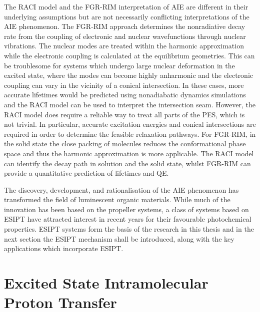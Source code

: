 The \ac{RACI} model and the \ac{FGR-RIM} interpretation of AIE are different in their underlying assumptions but are not necessarily conflicting interpretations of the AIE phenomenon. The \ac{FGR-RIM} approach determines the nonradiative decay rate from the coupling of electronic and nuclear wavefunctions through nuclear vibrations. The nuclear modes are treated within the harmonic approximation while the electronic coupling is calculated at the equilibrium geometries. This can be troublesome for systems which undergo large nuclear deformation in the excited state, where the modes can become highly anharmonic and the electronic coupling can vary in the vicinity of a conical intersection. In these cases, more accurate lifetimes would be predicted using nonadiabatic dynamics simulations and the \ac{RACI} model can be used to interpret the intersection seam. However, the \ac{RACI} model does require a reliable way to treat all parts of the \ac{PES}, which is not trivial. In particular, accurate excitation energies and conical intersections are required in order to determine the feasible relaxation pathways. For \ac{FGR-RIM}, in the solid state the close packing of molecules reduces the conformational phase space and thus the harmonic approximation is more applicable. The \ac{RACI} model can identify the decay path in solution and the solid state, whilst \ac{FGR-RIM} can provide a quantitative prediction of lifetimes and \ac{QE}.

The discovery, development, and rationalisation of the \ac{AIE} phenomenon has transformed the field of luminescent organic materials. While much of the innovation has been based on the propeller systems, a class of systems based on \ac{ESIPT} have attracted interest in recent years for their favourable photochemical properties. \ac{ESIPT} systems form the basis of the research in this thesis and in the next section the \ac{ESIPT} mechanism shall be introduced, along with the key applications which incorporate \ac{ESIPT}.

\section{Excited State Intramolecular Proton Transfer}\label{section: lom ESIPT}
